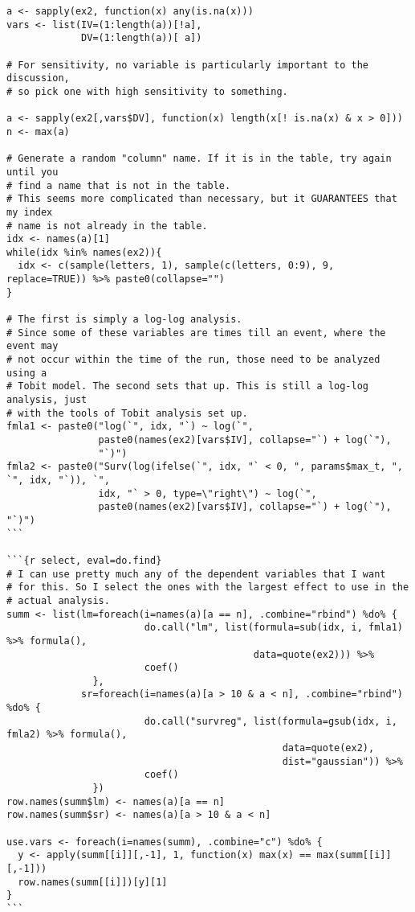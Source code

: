 \begin{lstlisting}[basicstyle=\scriptsize]
a <- sapply(ex2, function(x) any(is.na(x)))
vars <- list(IV=(1:length(a))[!a],
             DV=(1:length(a))[ a])

# For sensitivity, no variable is particularly important to the discussion,
# so pick one with high sensitivity to something.

a <- sapply(ex2[,vars$DV], function(x) length(x[! is.na(x) & x > 0]))
n <- max(a)

# Generate a random "column" name. If it is in the table, try again until you
# find a name that is not in the table.
# This seems more complicated than necessary, but it GUARANTEES that my index
# name is not already in the table.
idx <- names(a)[1]
while(idx %in% names(ex2)){
  idx <- c(sample(letters, 1), sample(c(letters, 0:9), 9, replace=TRUE)) %>% paste0(collapse="")
}

# The first is simply a log-log analysis.
# Since some of these variables are times till an event, where the event may
# not occur within the time of the run, those need to be analyzed using a
# Tobit model. The second sets that up. This is still a log-log analysis, just
# with the tools of Tobit analysis set up.
fmla1 <- paste0("log(`", idx, "`) ~ log(`",
                paste0(names(ex2)[vars$IV], collapse="`) + log(`"),
                "`)")
fmla2 <- paste0("Surv(log(ifelse(`", idx, "` < 0, ", params$max_t, ", `", idx, "`)), `",
                idx, "` > 0, type=\"right\") ~ log(`",
                paste0(names(ex2)[vars$IV], collapse="`) + log(`"), "`)")
```

```{r select, eval=do.find}
# I can use pretty much any of the dependent variables that I want
# for this. So I select the ones with the largest effect to use in the
# actual analysis.
summ <- list(lm=foreach(i=names(a)[a == n], .combine="rbind") %do% {
                        do.call("lm", list(formula=sub(idx, i, fmla1) %>% formula(),
                                           data=quote(ex2))) %>%
                        coef()
               },
             sr=foreach(i=names(a)[a > 10 & a < n], .combine="rbind") %do% {
                        do.call("survreg", list(formula=gsub(idx, i, fmla2) %>% formula(),
                                                data=quote(ex2),
                                                dist="gaussian")) %>%
                        coef()
               })
row.names(summ$lm) <- names(a)[a == n]
row.names(summ$sr) <- names(a)[a > 10 & a < n]

use.vars <- foreach(i=names(summ), .combine="c") %do% {
  y <- apply(summ[[i]][,-1], 1, function(x) max(x) == max(summ[[i]][,-1]))
  row.names(summ[[i]])[y][1]
}
```


\end{lstlisting}
